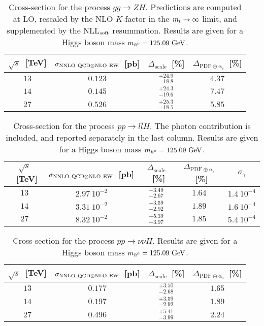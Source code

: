 \begin{table}
\centering
\begin{tabular}{cccc}%
\toprule
$\sqrt{s}$~[TeV] & $\sigma_{{\rm NNLO~QCD}\otimes{\rm NLO~EW}}$~[pb] & $\Delta_{\mathrm{scale}}$~[\%] &
$\Delta_{\mathrm{PDF\oplus\alpha_s}}$~[\%] \\
\midrule
$13$ & $0.123$ & $^{+24.9}_{-18.8}$ & $4.37$ \\
$14$ & $0.145$ & $^{+24.3}_{-19.6}$ & $7.47$ \\
$27$ & $0.526$ & $^{+25.3}_{-18.5}$ & $5.85$ \\
\bottomrule
\end{tabular}%
\caption{Cross-section for the process $g g  \to ZH$. Predictions are computed 
at LO, rescaled by the NLO $K$-factor in the $m_t \to \infty$ limit,
and supplemented by the NLL$_{\rm soft}$ resummation. Results are given for a Higgs boson mass $m_{h^0} = 125.09~{\rm GeV}$.}
\label{tab:ggZH_xsec}
\end{table}

\begin{table}
\centering
\begin{tabular}{cccc|c}%
\toprule
$\sqrt{s}$~[TeV] & $\sigma_{{\rm NNLO~QCD}\otimes{\rm NLO~EW}}$~[pb] & $\Delta_{\mathrm{scale}}$~[\%] &
$\Delta_{\mathrm{PDF\oplus\alpha_s}}$~[\%] & $\sigma_{\gamma}$\\
\midrule
$13$ & $2.97~10^{-2}$ & $^{+3.49}_{-2.67}$ & $1.64$ & $1.4~10^{-4}$\\
$14$ & $3.31~10^{-2}$ & $^{+3.59}_{-2.92}$ & $1.89$ & $1.6~10^{-4}$\\
$27$ & $8.32~10^{-2}$ & $^{+5.39}_{-3.97}$ & $1.85$ & $5.4~10^{-4}$\\
\bottomrule
\end{tabular}%
\caption{Cross-section for the process $p p   \to l\bar lH$. The photon contribution is included,
and reported separately in the last column.  Results are given for a Higgs boson mass $m_{h^0} = 125.09~{\rm GeV}$.}
\label{tab:llZH_xsec}
\end{table}

\begin{table}
\centering
\begin{tabular}{cccc}%
\toprule
$\sqrt{s}$~[TeV] & $\sigma_{{\rm NNLO~QCD}\otimes{\rm NLO~EW}}$~[pb] & $\Delta_{\mathrm{scale}}$~[\%] &
$\Delta_{\mathrm{PDF\oplus\alpha_s}}$~[\%] \\
\midrule
$13$ & $0.177$ & $^{+3.50}_{-2.68}$ & $1.65$ \\
$14$ & $0.197$ & $^{+3.59}_{-2.92}$ & $1.89$ \\
$27$ & $0.496$ & $^{+5.41}_{-3.99}$ & $2.24$ \\
\bottomrule
\end{tabular}%
\caption{Cross-section for the process $p p   \to \nu\bar \nu H$. Results are given for a Higgs boson mass $m_{h^0} = 125.09~{\rm GeV}$.}
\label{tab:nnZH_xsec}
\end{table}



